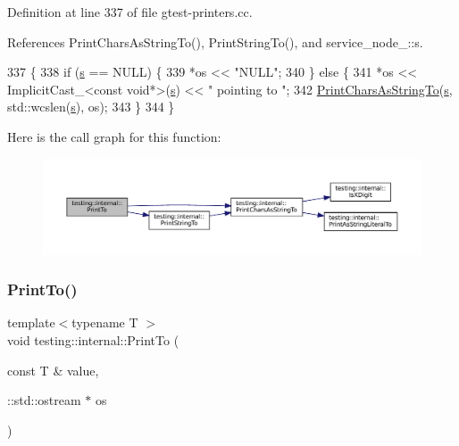 Definition at line 337 of file gtest-\/printers.\+cc.



References Print\+Chars\+As\+String\+To(), Print\+String\+To(), and service\+\_\+node\+\_\+::s.


\begin{DoxyCode}
337                                             \{
338   \textcolor{keywordflow}{if} (\hyperlink{namespaceservice__node__3_aa976421a49e0b54f23833423400849ae}{s} == NULL) \{
339     *os << \textcolor{stringliteral}{"NULL"};
340   \} \textcolor{keywordflow}{else} \{
341     *os << ImplicitCast\_<const void*>(\hyperlink{namespaceservice__node__3_aa976421a49e0b54f23833423400849ae}{s}) << \textcolor{stringliteral}{" pointing to "};
342     \hyperlink{namespacetesting_1_1internal_a0be71e6d7cb274131c559193f81c83e2}{PrintCharsAsStringTo}(\hyperlink{namespaceservice__node__3_aa976421a49e0b54f23833423400849ae}{s}, std::wcslen(\hyperlink{namespaceservice__node__3_aa976421a49e0b54f23833423400849ae}{s}), os);
343   \}
344 \}
\end{DoxyCode}
Here is the call graph for this function\+:
\nopagebreak
\begin{figure}[H]
\begin{center}
\leavevmode
\includegraphics[width=350pt]{namespacetesting_1_1internal_afc20fb56b2547a8f91f9ff99650f2024_cgraph}
\end{center}
\end{figure}
\mbox{\label{namespacetesting_1_1internal_adb3c27150dbe661db0e0c4be27533460}} 
\subsubsection{\texorpdfstring{Print\+To()}{PrintTo()}\hspace{0.1cm}{\footnotesize\ttfamily [4/20]}}
{\footnotesize\ttfamily template$<$typename T $>$ \\
void testing\+::internal\+::\+Print\+To (\begin{DoxyParamCaption}\item[{const T \&}]{value,  }\item[{\+::std\+::ostream $\ast$}]{os }\end{DoxyParamCaption})}



